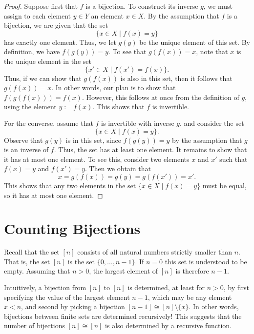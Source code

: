 \begin{proof}
  Suppose first that $f$ is a bijection. To construct its inverse $g$, we must assign to each element $y\in Y$ an element $x\in X$. By the assumption that $f$ is a bijection, we are given that the set
  \begin{equation*}
    \{x\in X\mid f(x)=y\}
  \end{equation*}
  has exactly one element. Thus, we let $g(y)$ be the unique element of this set. By definition, we have $f(g(y))=y$. To see that $g(f(x))=x$, note that $x$ is the unique element in the set
  \begin{equation*}
    \{x'\in X\mid f(x')=f(x)\}.
  \end{equation*}
  Thus, if we can show that $g(f(x))$ is also in this set, then it follows that $g(f(x))=x$. In other words, our plan is to show that $f(g(f(x)))=f(x)$. However, this follows at once from the definition of $g$, using the element $y:=f(x)$. This shows that $f$ is invertible.

  For the converse, assume that $f$ is invertible with inverse $g$, and consider the set
  \begin{equation*}
    \{x\in X\mid f(x)=y\}.
  \end{equation*}
  Observe that $g(y)$ is in this set, since $f(g(y))=y$ by the assumption that $g$ is an inverse of $f$. Thus, the set has at least one element. It remains to show that it has at most one element. To see this, consider two elements $x$ and $x'$ such that $f(x)=y$ and $f(x')=y$. Then we obtain that
  \begin{equation*}
    x=g(f(x))=g(y)=g(f(x'))=x'.
  \end{equation*}
  This shows that any two elements in the set $\{x\in X\mid f(x)=y\}$ must be equal, so it has at most one element.
\end{proof}

\section{Counting Bijections}

Recall that the set $[n]$ consists of all natural numbers strictly smaller than $n$. That is, the set $[n]$ is the set $\{0,\ldots,n-1\}$. If $n=0$ this set is understood to be empty. Assuming that $n>0$, the largest element of $[n]$ is therefore $n-1$.

Intuitively, a bijection from $[n]$ to $[n]$ is determined, at least for $n>0$, by first specifying the value of the largest element $n-1$, which may be any element $x<n$, and second by picking a bijection $[n-1]\cong[n]\setminus\{x\}$. In other words, bijections between finite sets are determined recursively! This suggests that the number of bijections $[n]\cong [n]$ is also determined by a recursive function.

